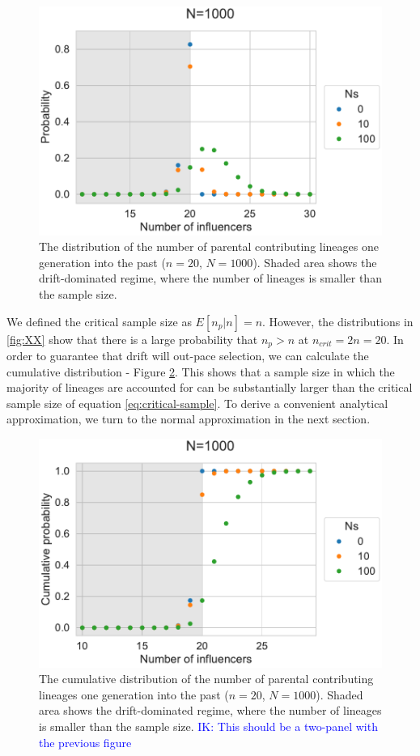\documentclass[review]{elsarticle}
\newcommand{\ikcomment}[1]{\textcolor{blue}{IK: #1}}
\begin{document}
\begin{figure}
  \centering
  \includegraphics[]{fig/sampling-dist.pdf}
  \caption{The distribution of the number of parental contributing lineages one generation into the
    past ($n=20$, $N=1000$). Shaded area shows the drift-dominated regime, where the number of
    lineages is smaller than the sample size.}
  \label{fig:sampling-dist}
\end{figure}

We defined the critical sample size as $E[n_p | n] = n$. However, the distributions in \ref{fig:XX}
show that there is a large probability that $n_p>n$ at $n_{crit}=2n=20$. In order to guarantee that
drift will out-pace selection, we can calculate the cumulative distribution - Figure
\ref{fig:cumulative-dist}. This shows that a sample size in which the majority of lineages are
accounted for can be substantially larger than the critical sample size of equation
\eqref{eq:critical-sample}. To derive a convenient analytical approximation, we turn to the normal
approximation in the next section.

\begin{figure}
  \centering
  \includegraphics[]{fig/cumulative-dist.pdf}
   \caption{The cumulative distribution of the number of parental contributing lineages one generation into the
    past ($n=20$, $N=1000$). Shaded area shows the drift-dominated regime, where the number of
    lineages is smaller than the sample size. \ikcomment{This should be a two-panel with the
      previous figure}}
  \label{fig:cumulative-dist}
\end{figure}
\end{document}
